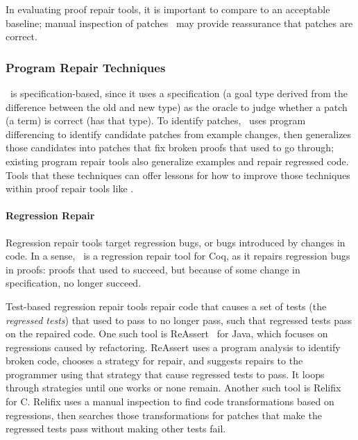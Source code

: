 In evaluating proof repair tools, it is important to compare to an acceptable baseline; 
manual inspection of patches~\cite{DBLP:journals/corr/abs-1811-02429} 
may provide reassurance that patches are correct.

\subsubsection{Program Repair Techniques}
\label{sec:techniques}

\sysname\ is specification-based, since it uses a specification (a goal type derived from the difference
between the old and new type) as the oracle to judge whether a patch (a term) is correct (has that type). To identify
patches, \sysname\ uses program differencing to identify candidate patches from example changes, 
then generalizes those candidates into patches that fix broken proofs that used to go through; existing program repair tools also generalize
examples and repair regressed code.
Tools that these techniques can offer lessons for how to improve those techniques within proof repair tools like \sysname.

\paragraph{Regression Repair} Regression repair tools target regression bugs,
or bugs introduced by changes in code.
In a sense, \sysname\ is a regression repair tool for Coq, as it repairs regression bugs in proofs:
proofs that used to succeed, but because of some change in specification, no longer succeed.

Test-based regression repair tools repair code that causes a set of tests (the \textit{regressed tests}) that used to pass to no longer pass,
such that regressed tests pass on the repaired code.
One such tool is ReAssert~\cite{daniel2009reassert} for Java,
which focuses on regressions caused by refactoring.
ReAssert uses a program analysis to identify broken code,
chooses a strategy for repair, and suggests repairs to the programmer using that strategy that cause regressed tests to pass.
It loops through strategies until one works or none remain.
Another such tool is Relifix~\cite{Tan:2015:RAR:2818754.2818813} for C.
Relifix uses a manual inspection to find code transformations based on regressions, then searches those transformations for 
patches that make the regressed tests pass without making other tests fail. %

